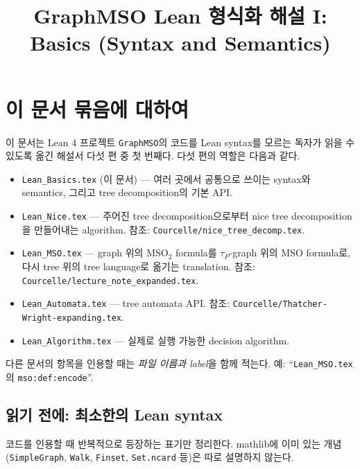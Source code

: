 \documentclass[11pt]{article}
\title{GraphMSO Lean 형식화 해설 I: Basics (Syntax and Semantics)}
\author{}
\date{}
\theoremstyle{definition}
\theoremstyle{plain}
\newcommand{\MSO}{\mathrm{MSO}}
\newcommand{\MSOtwo}{\mathrm{MSO}_2}
\newcommand{\lean}[1]{\texttt{#1}}
\newcommand{\leanfile}[1]{\texttt{#1}}
\begin{document}
\maketitle

\tableofcontents

\section{이 문서 묶음에 대하여}

이 문서는 Lean 4 프로젝트 \leanfile{GraphMSO}의 코드를 Lean syntax를 모르는
독자가 읽을 수 있도록 옮긴 해설서 다섯 편 중 첫 번째다.
다섯 편의 역할은 다음과 같다.

\begin{itemize}
  \item \leanfile{Lean\_Basics.tex} (이 문서) --- 여러 곳에서 공통으로 쓰이는
    syntax와 semantics, 그리고 tree decomposition의 기본 API.
  \item \leanfile{Lean\_Nice.tex} --- 주어진 tree decomposition으로부터
    nice tree decomposition을 만들어내는 algorithm.
    참조: \leanfile{Courcelle/nice\_tree\_decomp.tex}.
  \item \leanfile{Lean\_MSO.tex} --- graph 위의 $\MSOtwo$ formula를
    $\tau_P$-graph 위의 $\MSO$ formula로, 다시 tree 위의 tree language로
    옮기는 translation.
    참조: \leanfile{Courcelle/lecture\_note\_expanded.tex}.
  \item \leanfile{Lean\_Automata.tex} --- tree automata API.
    참조: \leanfile{Courcelle/Thatcher-Wright-expanding.tex}.
  \item \leanfile{Lean\_Algorithm.tex} --- 실제로 실행 가능한 decision algorithm.
\end{itemize}

다른 문서의 항목을 인용할 때는 \emph{파일 이름과 label}을 함께 적는다.
예: ``\leanfile{Lean\_MSO.tex}의 \lean{mso:def:encode}''.

\subsection{읽기 전에: 최소한의 Lean syntax}
\label{basics:sec:leansyntax}

코드를 인용할 때 반복적으로 등장하는 표기만 정리한다. mathlib에 이미
있는 개념(\lean{SimpleGraph}, \lean{Walk}, \lean{Finset}, \lean{Set.ncard}
등)은 따로 설명하지 않는다.
\end{document}
